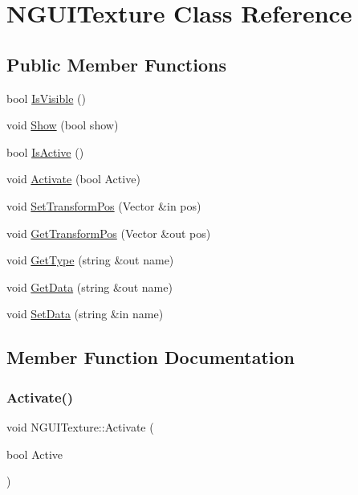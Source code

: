 \hypertarget{class_n_g_u_i_texture}{}\section{N\+G\+U\+I\+Texture Class Reference}
\label{class_n_g_u_i_texture}
\subsection*{Public Member Functions}
\begin{DoxyCompactItemize}
\item 
bool \hyperlink{class_n_g_u_i_texture_a7f294b6e4f7633a9982123ff8613d035}{Is\+Visible} ()
\item 
void \hyperlink{class_n_g_u_i_texture_ae23179192e505901ab045c6bb9147bc2}{Show} (bool show)
\item 
bool \hyperlink{class_n_g_u_i_texture_ae354cba67d07f4151d1449875227651a}{Is\+Active} ()
\item 
void \hyperlink{class_n_g_u_i_texture_a893c35832e7c5c56f9c3ddd8718f5985}{Activate} (bool Active)
\item 
void \hyperlink{class_n_g_u_i_texture_a177fbcf853afa834509e974c2ee2ed97}{Set\+Transform\+Pos} (Vector \&in pos)
\item 
void \hyperlink{class_n_g_u_i_texture_a8904479dd74cd237e4c478a4c2ed78f4}{Get\+Transform\+Pos} (Vector \&out pos)
\item 
void \hyperlink{class_n_g_u_i_texture_ab878082ab5011b04424def1dcfaf03d3}{Get\+Type} (string \&out name)
\item 
void \hyperlink{class_n_g_u_i_texture_a15f2d656d5da12b951e09d50f717e7e9}{Get\+Data} (string \&out name)
\item 
void \hyperlink{class_n_g_u_i_texture_af551aadd67b2803e847569aba90422fa}{Set\+Data} (string \&in name)
\end{DoxyCompactItemize}


\subsection{Member Function Documentation}
\hypertarget{class_n_g_u_i_texture_a893c35832e7c5c56f9c3ddd8718f5985}{}\label{class_n_g_u_i_texture_a893c35832e7c5c56f9c3ddd8718f5985} 
\subsubsection{\texorpdfstring{Activate()}{Activate()}}
{\footnotesize\ttfamily void N\+G\+U\+I\+Texture\+::\+Activate (\begin{DoxyParamCaption}\item[{bool}]{Active }\end{DoxyParamCaption})}

